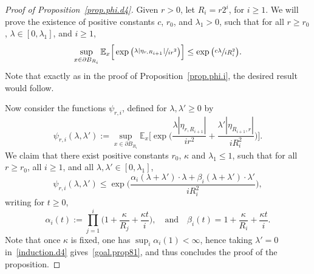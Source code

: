 \documentclass[11pt]{article}
\numberwithin{equation}{section}
\theoremstyle{plain}
\theoremstyle{definition}
\newcommand{\1}{{\text{\Large $\mathfrak 1$}}}
\begin{document}
\begin{proof}[Proof of Proposition~\ref{prop.phi.d4}]
Given $r>0$, let $R_i = r2^i$, for $i\ge 1$. We will prove the existence of positive constants
$c$, $r_0$, and $\lambda_1>0$, such that for all $r\ge r_0$, $\lambda\in[0,\lambda_1]$, and $i\ge 1$,
\begin{equation}\label{goal.prop81}
\sup_{x\in \partial B_{R_i}}\mathbb E_x\Big[\exp\big(\sfrac{\lambda |\eta_{r,R_{i+1}}|}{ir^2}\big)\Big] \le \exp\big(\sfrac{c\lambda}{iR_i^2}\big).
\end{equation}
Note that exactly as in the proof of Proposition~\ref{prop.phi.i}, the desired result would follow.

Now consider the functions $\psi_{r,i}$, defined for $\lambda,\lambda'\ge 0$ by
\[
\psi_{r,i}(\lambda,\lambda'):= \sup_{x\in \partial B_{R_i}}\mathbb E_x\Big[\exp\Big(\frac{\lambda |\eta_{r,R_{i+1}}|}{ir^2}+\frac{\lambda' |\eta_{R_{i+1},r}|}{iR_i^2}\Big)\Big].
\]
We claim that there exist positive constants $r_0$, $\kappa$ and $\lambda_1\le 1$, such that for all $r\ge r_0$, all $i\ge 1$, and all $\lambda, \lambda'\in[0,\lambda_1]$,
\begin{equation}\label{induction.d4}
\psi_{r,i}(\lambda,\lambda') \le \exp\Big(\frac{\alpha_i(\lambda+\lambda')\cdot \lambda+\beta_i(\lambda+\lambda')\cdot\lambda'}{iR_i^2}\Big),
\end{equation}
writing for $t\ge 0$,
\[
\alpha_i(t) := \prod_{j=1}^i\Big(1+\frac{\kappa }{R_j}+\frac {\kappa t} i\Big), \quad \text{and}\quad \beta_i(t)=1+\frac{\kappa }{R_i}+\frac{\kappa t}{i}.
\]
Note that once $\kappa$ is fixed, one has $\sup_i \alpha_i(1)<\infty$, hence taking $ \lambda'=0$ in~\eqref{induction.d4} gives~\eqref{goal.prop81}, and thus concludes the proof of the proposition.


\end{proof}
\end{document}
